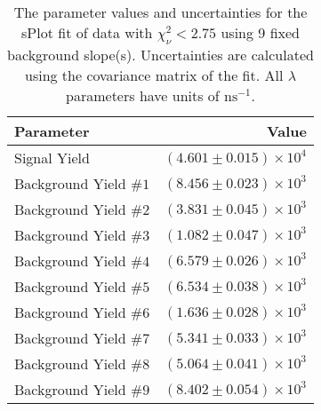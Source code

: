 
\begin{table}
    \begin{center}
        \begin{tabular}{lr}\toprule
            Parameter & Value \\\midrule
            Signal Yield & $(4.601 \pm 0.015) \times 10^{4}$ \\
            Background Yield $\#1$ & $(8.456 \pm 0.023) \times 10^{3}$ \\
            Background Yield $\#2$ & $(3.831 \pm 0.045) \times 10^{3}$ \\
            Background Yield $\#3$ & $(1.082 \pm 0.047) \times 10^{3}$ \\
            Background Yield $\#4$ & $(6.579 \pm 0.026) \times 10^{3}$ \\
            Background Yield $\#5$ & $(6.534 \pm 0.038) \times 10^{3}$ \\
            Background Yield $\#6$ & $(1.636 \pm 0.028) \times 10^{3}$ \\
            Background Yield $\#7$ & $(5.341 \pm 0.033) \times 10^{3}$ \\
            Background Yield $\#8$ & $(5.064 \pm 0.041) \times 10^{3}$ \\
            Background Yield $\#9$ & $(8.402 \pm 0.054) \times 10^{3}$ \\\bottomrule
        \end{tabular}
        \caption{The parameter values and uncertainties for the sPlot fit of data with $\chi^2_\nu < 2.75$ using 9 fixed background slope(s). Uncertainties are calculated using the covariance matrix of the fit. All $\lambda$ parameters have units of $\si{\nano\second}^{-1}$.}
    \end{center}
\end{table}
